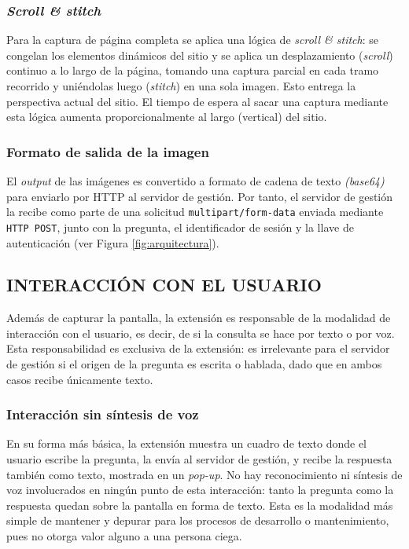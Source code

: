 \subsubsection{\textit{Scroll \& stitch}}

Para la captura de página completa se aplica una lógica de \textit{scroll \& stitch}: se congelan los elementos dinámicos del sitio y se aplica un desplazamiento (\textit{scroll}) continuo a lo largo de la página, tomando una captura parcial en cada tramo recorrido y uniéndolas luego (\textit{stitch}) en una sola imagen. Esto entrega la perspectiva actual del sitio. El tiempo de espera al sacar una captura mediante esta lógica aumenta proporcionalmente al largo (vertical) del sitio.

\subsubsection{Formato de salida de la imagen}

El \textit{output} de las imágenes es convertido a formato de cadena de texto \textit{(base64)} para enviarlo por HTTP al servidor de gestión. Por tanto, el servidor de gestión la recibe como parte de una solicitud \texttt{multipart/form-data} enviada mediante \texttt{HTTP POST}, junto con la pregunta, el identificador de sesión y la llave de autenticación (ver Figura \ref{fig:arquitectura}).

\subsection{INTERACCIÓN CON EL USUARIO}

Además de capturar la pantalla, la extensión es responsable de la modalidad de interacción con el usuario, es decir, de si la consulta se hace por texto o por voz. Esta responsabilidad es exclusiva de la extensión: es irrelevante para el servidor de gestión si el origen de la pregunta es escrita o hablada, dado que en ambos casos recibe únicamente texto.

\subsubsection{Interacción sin síntesis de voz}

En su forma más básica, la extensión muestra un cuadro de texto donde el usuario escribe la pregunta, la envía al servidor de gestión, y recibe la respuesta también como texto, mostrada en un \textit{pop-up}. No hay reconocimiento ni síntesis de voz involucrados en ningún punto de esta interacción: tanto la pregunta como la respuesta quedan sobre la pantalla en forma de texto. Esta es la modalidad más simple de mantener y depurar para los procesos de desarrollo o mantenimiento, pues no otorga valor alguno a una persona ciega.


